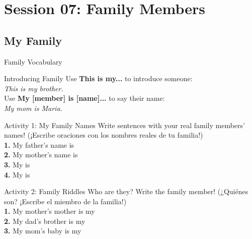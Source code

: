 \section*{Session 07: Family Members}
\subsection*{My Family}

\begin{vocabcard}{Family Vocabulary}
\end{vocabcard}

\begin{grammartip}{Introducing Family}
  Use \textbf{This is my...} to introduce someone:\\
  \emph{This is my brother.}\\
  Use \textbf{My [member] is [name]...} to say their name:\\
  \emph{My mom is Maria.}
\end{grammartip}

\begin{activity}{Activity 1: My Family Names}
  Write sentences with your real family members' names! (¡Escribe oraciones con los nombres reales de tu familia!)\\
  \textbf{1.} My father's name is \answerline[4cm] \\
  \textbf{2.} My mother's name is \answerline[4cm] \\
  \textbf{3.} My \answerline[2cm] is \answerline[4cm] \\
  \textbf{4.} My \answerline[2cm] is \answerline[4cm]
\end{activity}

\begin{activity}{Activity 2: Family Riddles}
  Who are they? Write the family member! (¿Quiénes son? ¡Escribe el miembro de la familia!)\\
  \textbf{1.} My mother's mother is my \answerline[3cm] \\
  \textbf{2.} My dad's brother is my \answerline[3cm] \\
  \textbf{3.} My mom's baby is my \answerline[3cm]
\end{activity}

